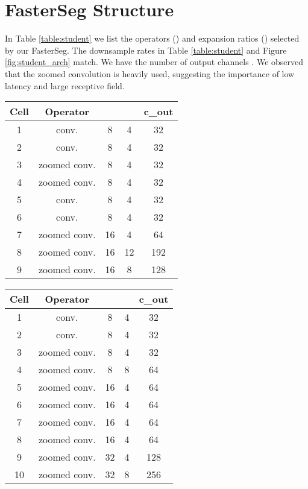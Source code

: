 \documentclass{article} \usepackage{iclr2020_conference,times}
\begin{document}
\section{FasterSeg Structure}\vspace{-0.7em} \label{app:fasterseg}
In Table \ref{table:student} we list the operators () and expansion ratios () selected by our FasterSeg. The downsample rates  in Table \ref{table:student} and Figure \ref{fig:student_arch} match. We have the number of output channels . We observed that the zoomed convolution is heavily used, suggesting the importance of low latency and large receptive field.



\begin{table*}[!htb]
\footnotesize
\caption{Cells used in FasterSeg. Left: cells for branch with final downsample rate of 16. Right: cells for branch with final downsample rate of 32. : downsample rate. : expansion ratio. c\_out: number of output channels.}
\begin{minipage}[t]{.45\linewidth}
\centering
\begin{tabular}{ccccc}
\toprule
Cell & Operator &  &  & c\_out \\ \midrule
1 & conv.  & 8 & 4 & 32 \\
2 & conv.  & 8 & 4 & 32 \\
3 & zoomed conv.  & 8 & 4 & 32 \\
4 & zoomed conv.  & 8 & 4 & 32 \\
5 & conv.  & 8 & 4 & 32 \\
6 & conv.  & 8 & 4 & 32 \\
7 & zoomed conv.  & 16 & 4 & 64 \\
8 & zoomed conv.  & 16 & 12 & 192 \\
9 & zoomed conv.  & 16 & 8 & 128 \\ \bottomrule
\end{tabular}
\end{minipage}\hfill \begin{minipage}[t]{.45\linewidth}
\centering
\begin{tabular}{ccccc}
\toprule
Cell & Operator &  &  & c\_out \\ \midrule
1 & conv.  & 8 & 4 & 32 \\
2 & conv.  & 8 & 4 & 32 \\
3 & zoomed conv.  & 8 & 4 & 32 \\
4 & zoomed conv. & 8 & 8 & 64 \\
5 & zoomed conv.  & 16 & 4 & 64 \\
6 & zoomed conv.  & 16 & 4 & 64 \\
7 & zoomed conv.  & 16 & 4 & 64 \\
8 & zoomed conv.  & 16 & 4 & 64 \\
9 & zoomed conv.  & 32 & 4 & 128 \\
10 & zoomed conv.  & 32 & 8 & 256 \\ \bottomrule
\end{tabular}
\end{minipage}\label{table:student}
\end{table*}
\end{document}
